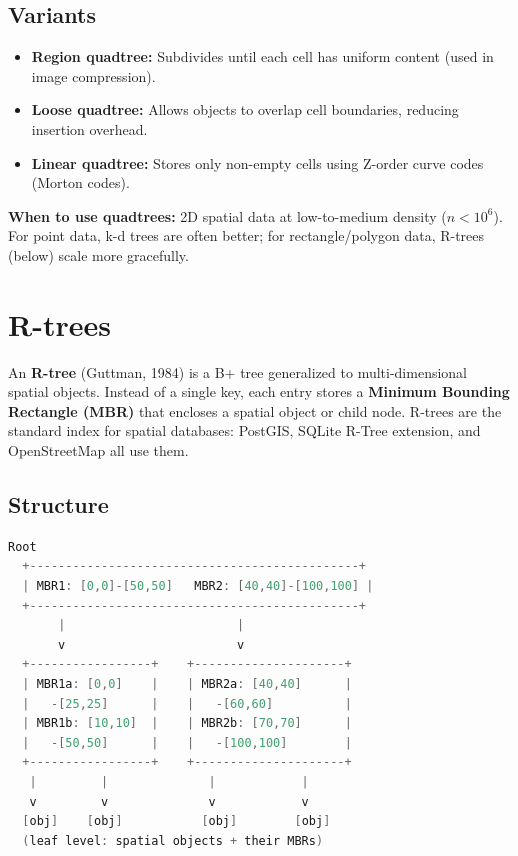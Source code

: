 \subsection{Variants}

\begin{itemize}
\item \textbf{Region quadtree:} Subdivides until each cell has uniform content (used in image compression).
\item \textbf{Loose quadtree:} Allows objects to overlap cell boundaries, reducing insertion overhead.
\item \textbf{Linear quadtree:} Stores only non-empty cells using Z-order curve codes (Morton codes).
\end{itemize}

\textbf{When to use quadtrees:} 2D spatial data at low-to-medium density ($n < 10^{6}$). For point data, k-d trees are often better; for rectangle/polygon data, R-trees (below) scale more gracefully.

\section{R-trees}

An \textbf{R-tree} (Guttman, 1984) is a B+ tree generalized to multi-dimensional spatial objects. Instead of a single key, each entry stores a \textbf{Minimum Bounding Rectangle (MBR)} that encloses a spatial object or child node. R-trees are the standard index for spatial databases: PostGIS, SQLite R-Tree extension, and OpenStreetMap all use them.

\subsection{Structure}

\begin{lstlisting}[language=Java]
  Root
  +----------------------------------------------+
  | MBR1: [0,0]-[50,50]   MBR2: [40,40]-[100,100] |
  +----------------------------------------------+
       |                        |
       v                        v
  +-----------------+    +---------------------+
  | MBR1a: [0,0]    |    | MBR2a: [40,40]      |
  |   -[25,25]      |    |   -[60,60]          |
  | MBR1b: [10,10]  |    | MBR2b: [70,70]      |
  |   -[50,50]      |    |   -[100,100]        |
  +-----------------+    +---------------------+
   |         |              |            |
   v         v              v            v
  [obj]    [obj]           [obj]        [obj]
  (leaf level: spatial objects + their MBRs)
\end{lstlisting}

